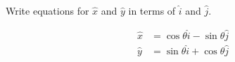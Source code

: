 Write equations for $\hat{x}$ and $\hat{y}$ in terms of $\hat{i}$ and $\hat{j}$.

\begin{solution}
    \begin{align*}
        \hat{x} &= \cos\theta\hat{i} - \sin\theta\hat{j} \\
        \hat{y} &= \sin\theta\hat{i} + \cos\theta\hat{j}
    \end{align*}
\end{solution}